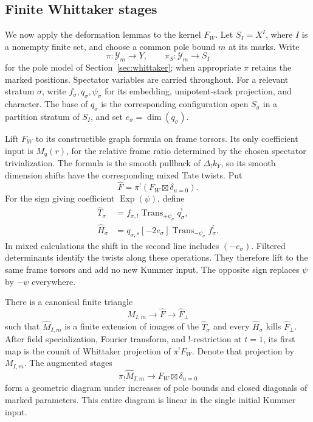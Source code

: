 \subsection{Finite Whittaker stages}\label{deform:finite-stages}

We now apply the deformation lemmas to the kernel $F_W$.  Let
$S_I=X^I$, where $I$ is a nonempty finite set, and choose a common
pole bound $m$ at its marks.  Write
\[
 \pi:\mathcal Y_m\longrightarrow Y,\qquad
 \pi_S:\mathcal Y_m\longrightarrow S_I
\]
for the pole model of Section~\ref{sec:whittaker}; when appropriate
$\pi$ retains the marked positions.  Spectator variables are
carried throughout.  For a relevant stratum $\sigma$, write
$f_\sigma,q_\sigma,\psi_\sigma$ for its embedding, unipotent-stack
projection, and character.  The base of $q_\sigma$ is the
corresponding configuration open $S_\sigma$ in a partition
stratum of $S_I$, and set $e_\sigma=\dim(q_\sigma)$.

Lift $F_W$ to its constructible graph formula on frame torsors.
Its only coefficient input is $M_q(r)$, for the relative frame
ratio determined by the chosen spectator trivialization.  The
formula is the smooth pullback of $\Delta_!k_Y$, so its smooth
dimension shifts have the corresponding mixed Tate twists.
Put
\[
             \widehat F=\pi^!(F_W\boxtimes\delta_{u=0}).
\]
For the sign giving coefficient $\operatorname{Exp}(\psi)$, define
\begin{equation}\label{eq:P3}
 \begin{split}
 \widehat T_\sigma&=f_{\sigma,!}
             \operatorname{Trans}_{+\psi_\sigma}q_\sigma^!,\\
 \widehat H_\sigma&=q_{\sigma,*}[-2e_\sigma]
             \operatorname{Trans}_{-\psi_\sigma}f_\sigma^!.
 \end{split}
\end{equation}
In mixed calculations the shift in the second line includes
$(-e_\sigma)$.  Filtered determinants identify the twists along
these operations.  They therefore lift to the same frame
torsors and add no new Kummer input.  The opposite sign replaces
$\psi$ by $-\psi$ everywhere.

\begin{proposition}\label{deform:stages}
There is a canonical finite triangle
\[
 \widehat M_{I,m}\longrightarrow\widehat F
                  \longrightarrow\widehat F_\perp
\]
such that $\widehat M_{I,m}$ is a finite extension of images of the
$\widehat T_\sigma$ and every $\widehat H_\sigma$ kills
$\widehat F_\perp$.  After field specialization, Fourier transform,
and $!$-restriction at $t=1$, its first map is the counit of
Whittaker projection of $\pi^!F_W$.  Denote that projection by
$M_{I,m}$.  The augmented stages
\begin{equation}\label{eq:P4}
        \pi_!\widehat M_{I,m}
                    \longrightarrow F_W\boxtimes\delta_{u=0}
\end{equation}
form a geometric diagram under increases of pole bounds and
closed diagonals of marked parameters.  This entire diagram is
linear in the single initial Kummer input.
\end{proposition}

